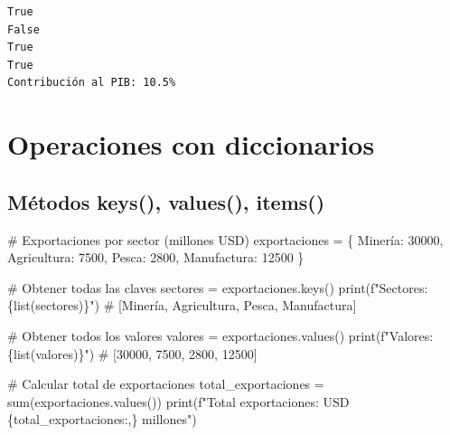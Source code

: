 \documentclass[
  doc,
  floatsintext,
  longtable,
  a4paper,
  nolmodern,
  notxfonts,
  notimes,
  12pt,
  colorlinks=true,linkcolor=blue,citecolor=blue,urlcolor=blue]{apa7}
\newenvironment{Shaded}{\begin{snugshade}}{\end{snugshade}}
\newcommand{\BuiltInTok}[1]{\textcolor[rgb]{0.00,0.23,0.31}{#1}}
\newcommand{\CommentTok}[1]{\textcolor[rgb]{0.37,0.37,0.37}{#1}}
\newcommand{\DecValTok}[1]{\textcolor[rgb]{0.68,0.00,0.00}{#1}}
\newcommand{\NormalTok}[1]{\textcolor[rgb]{0.00,0.23,0.31}{#1}}
\newcommand{\OperatorTok}[1]{\textcolor[rgb]{0.37,0.37,0.37}{#1}}
\newcommand{\SpecialCharTok}[1]{\textcolor[rgb]{0.37,0.37,0.37}{#1}}
\newcommand{\SpecialStringTok}[1]{\textcolor[rgb]{0.13,0.47,0.30}{#1}}
\newcommand{\StringTok}[1]{\textcolor[rgb]{0.13,0.47,0.30}{#1}}
\begin{document}
\begin{verbatim}
True
False
True
True
Contribución al PIB: 10.5%
\end{verbatim}

\section{Operaciones con
diccionarios}\label{operaciones-con-diccionarios}

\subsection{Métodos keys(), values(),
items()}\label{muxe9todos-keys-values-items}

\begin{Shaded}
\begin{Highlighting}[]
\CommentTok{\# Exportaciones por sector (millones USD)}
\NormalTok{exportaciones }\OperatorTok{=}\NormalTok{ \{}
    \StringTok{\textquotesingle{}Minería\textquotesingle{}}\NormalTok{: }\DecValTok{30000}\NormalTok{,}
    \StringTok{\textquotesingle{}Agricultura\textquotesingle{}}\NormalTok{: }\DecValTok{7500}\NormalTok{,}
    \StringTok{\textquotesingle{}Pesca\textquotesingle{}}\NormalTok{: }\DecValTok{2800}\NormalTok{,}
    \StringTok{\textquotesingle{}Manufactura\textquotesingle{}}\NormalTok{: }\DecValTok{12500}
\NormalTok{\}}

\CommentTok{\# Obtener todas las claves}
\NormalTok{sectores }\OperatorTok{=}\NormalTok{ exportaciones.keys()}
\BuiltInTok{print}\NormalTok{(}\SpecialStringTok{f"Sectores: }\SpecialCharTok{\{}\BuiltInTok{list}\NormalTok{(sectores)}\SpecialCharTok{\}}\SpecialStringTok{"}\NormalTok{)}
\CommentTok{\# [\textquotesingle{}Minería\textquotesingle{}, \textquotesingle{}Agricultura\textquotesingle{}, \textquotesingle{}Pesca\textquotesingle{}, \textquotesingle{}Manufactura\textquotesingle{}]}

\CommentTok{\# Obtener todos los valores}
\NormalTok{valores }\OperatorTok{=}\NormalTok{ exportaciones.values()}
\BuiltInTok{print}\NormalTok{(}\SpecialStringTok{f"Valores: }\SpecialCharTok{\{}\BuiltInTok{list}\NormalTok{(valores)}\SpecialCharTok{\}}\SpecialStringTok{"}\NormalTok{)}
\CommentTok{\# [30000, 7500, 2800, 12500]}

\CommentTok{\# Calcular total de exportaciones}
\NormalTok{total\_exportaciones }\OperatorTok{=} \BuiltInTok{sum}\NormalTok{(exportaciones.values())}
\BuiltInTok{print}\NormalTok{(}\SpecialStringTok{f"Total exportaciones: USD }\SpecialCharTok{\{}\NormalTok{total\_exportaciones}\SpecialCharTok{:,\}}\SpecialStringTok{ millones"}\NormalTok{)}


\end{Highlighting}
\end{Shaded}
\end{document}
